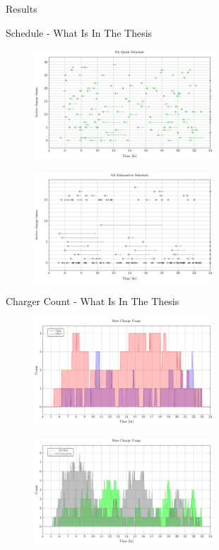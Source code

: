 \documentclass[aspectratio=169]{beamer}
\begin{document}
\begin{frame}[label={sec:org4ee59dd}]{Results}
\begin{frame}[label={sec:org3f477a6}]{Schedule - What Is In The Thesis}
\begin{figure}[htpb]
\centering
    \includegraphics[width=0.6\textwidth]{img/sa-pap-paper-bad/schedule-sa-quick}
\end{figure}
\begin{figure}[htpb]
\centering
    \includegraphics[width=0.6\textwidth]{img/sa-pap-paper-bad/schedule-sa-heuristic}
\end{figure}
\end{frame}

\begin{frame}[label={sec:orgd667ecb}]{Charger Count - What Is In The Thesis}
\begin{figure}[htpb]
\centering
    \includegraphics[width=0.6\textwidth]{img/sa-pap-paper-bad/charger-count-slow-milp-qin}
\end{figure}
\begin{figure}[htpb]
\centering
    \includegraphics[width=0.6\textwidth]{img/sa-pap-paper-bad/charger-count-slow-sa}
\end{figure}
\end{frame}


\end{frame}
\end{document}
